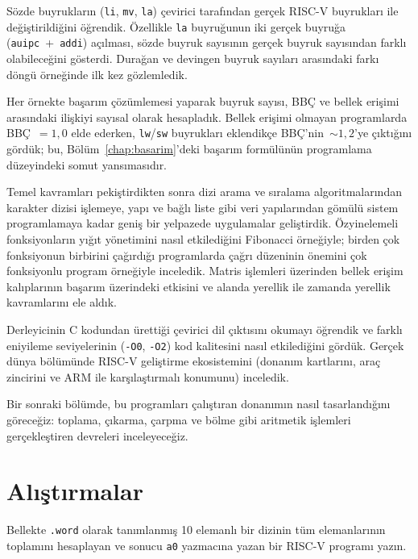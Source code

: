 Sözde buyrukların (\texttt{li}, \texttt{mv}, \texttt{la}) çevirici tarafından gerçek RISC-V buyrukları ile değiştirildiğini öğrendik. Özellikle \texttt{la} buyruğunun iki gerçek buyruğa (\texttt{auipc}~+~\texttt{addi}) açılması, sözde buyruk sayısının gerçek buyruk sayısından farklı olabileceğini gösterdi. Durağan ve devingen buyruk sayıları arasındaki farkı döngü örneğinde ilk kez gözlemledik.

Her örnekte başarım çözümlemesi yaparak buyruk sayısı, BBÇ ve bellek erişimi arasındaki ilişkiyi sayısal olarak hesapladık. Bellek erişimi olmayan programlarda BBÇ~$= 1{,}0$ elde ederken, \texttt{lw}/\texttt{sw} buyrukları eklendikçe BBÇ'nin~$\sim 1{,}2$'ye çıktığını gördük; bu, Bölüm~\ref{chap:basarim}'deki başarım formülünün programlama düzeyindeki somut yansımasıdır.

Temel kavramları pekiştirdikten sonra dizi arama ve sıralama algoritmalarından karakter dizisi işlemeye, yapı ve bağlı liste gibi veri yapılarından gömülü sistem programlamaya kadar geniş bir yelpazede uygulamalar geliştirdik. Özyinelemeli fonksiyonların yığıt yönetimini nasıl etkilediğini Fibonacci örneğiyle; birden çok fonksiyonun birbirini çağırdığı programlarda çağrı düzeninin önemini çok fonksiyonlu program örneğiyle inceledik. Matris işlemleri üzerinden bellek erişim kalıplarının başarım üzerindeki etkisini ve alanda yerellik ile zamanda yerellik kavramlarını ele aldık.

Derleyicinin C kodundan ürettiği çevirici dil çıktısını okumayı öğrendik ve farklı eniyileme seviyelerinin (\texttt{-O0}, \texttt{-O2}) kod kalitesini nasıl etkilediğini gördük. Gerçek dünya bölümünde RISC-V geliştirme ekosistemini (donanım kartlarını, araç zincirini ve ARM ile karşılaştırmalı konumunu) inceledik.

Bir sonraki bölümde, bu programları çalıştıran donanımın nasıl tasarlandığını göreceğiz: toplama, çıkarma, çarpma ve bölme gibi aritmetik işlemleri gerçekleştiren devreleri inceleyeceğiz.


\section*{Alıştırmalar}

\begin{alistirma}[\kolay]
Bellekte \texttt{.word} olarak tanımlanmış 10 elemanlı bir dizinin tüm elemanlarının toplamını hesaplayan ve sonucu \texttt{a0} yazmacına yazan bir RISC-V programı yazın.
\end{alistirma}

